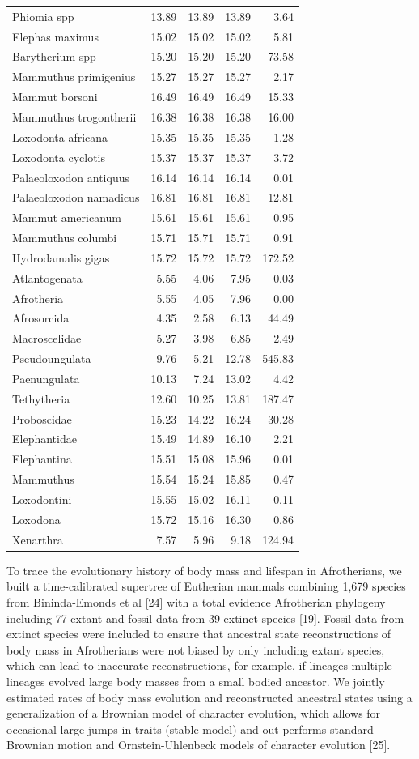 \documentclass[10pt,letterpaper]{article}
\begin{document}
\begin{longtable}[]{@{}lrrrr@{}}
Phiomia spp & 13.89 & 13.89 & 13.89 & 3.64\tabularnewline
Elephas maximus & 15.02 & 15.02 & 15.02 & 5.81\tabularnewline
Barytherium spp & 15.20 & 15.20 & 15.20 & 73.58\tabularnewline
Mammuthus primigenius & 15.27 & 15.27 & 15.27 & 2.17\tabularnewline
Mammut borsoni & 16.49 & 16.49 & 16.49 & 15.33\tabularnewline
Mammuthus trogontherii & 16.38 & 16.38 & 16.38 & 16.00\tabularnewline
Loxodonta africana & 15.35 & 15.35 & 15.35 & 1.28\tabularnewline
Loxodonta cyclotis & 15.37 & 15.37 & 15.37 & 3.72\tabularnewline
Palaeoloxodon antiquus & 16.14 & 16.14 & 16.14 & 0.01\tabularnewline
Palaeoloxodon namadicus & 16.81 & 16.81 & 16.81 & 12.81\tabularnewline
Mammut americanum & 15.61 & 15.61 & 15.61 & 0.95\tabularnewline
Mammuthus columbi & 15.71 & 15.71 & 15.71 & 0.91\tabularnewline
Hydrodamalis gigas & 15.72 & 15.72 & 15.72 & 172.52\tabularnewline
Atlantogenata & 5.55 & 4.06 & 7.95 & 0.03\tabularnewline
Afrotheria & 5.55 & 4.05 & 7.96 & 0.00\tabularnewline
Afrosorcida & 4.35 & 2.58 & 6.13 & 44.49\tabularnewline
Macroscelidae & 5.27 & 3.98 & 6.85 & 2.49\tabularnewline
Pseudoungulata & 9.76 & 5.21 & 12.78 & 545.83\tabularnewline
Paenungulata & 10.13 & 7.24 & 13.02 & 4.42\tabularnewline
Tethytheria & 12.60 & 10.25 & 13.81 & 187.47\tabularnewline
Proboscidae & 15.23 & 14.22 & 16.24 & 30.28\tabularnewline
Elephantidae & 15.49 & 14.89 & 16.10 & 2.21\tabularnewline
Elephantina & 15.51 & 15.08 & 15.96 & 0.01\tabularnewline
Mammuthus & 15.54 & 15.24 & 15.85 & 0.47\tabularnewline
Loxodontini & 15.55 & 15.02 & 16.11 & 0.11\tabularnewline
Loxodona & 15.72 & 15.16 & 16.30 & 0.86\tabularnewline
Xenarthra & 7.57 & 5.96 & 9.18 & 124.94\tabularnewline
\bottomrule
\end{longtable}

To trace the evolutionary history of body mass and lifespan in
Afrotherians, we built a time-calibrated supertree of Eutherian mammals
combining 1,679 species from Bininda-Emonds et al {[}24{]} with a total
evidence Afrotherian phylogeny including 77 extant and fossil data from
39 extinct species {[}19{]}. Fossil data from extinct species were
included to ensure that ancestral state reconstructions of body mass in
Afrotherians were not biased by only including extant species, which can
lead to inaccurate reconstructions, for example, if lineages multiple
lineages evolved large body masses from a small bodied ancestor. We
jointly estimated rates of body mass evolution and reconstructed
ancestral states using a generalization of a Brownian model of character
evolution, which allows for occasional large jumps in traits (stable
model) and out performs standard Brownian motion and Ornstein-Uhlenbeck
models of character evolution {[}25{]}.
\end{document}
